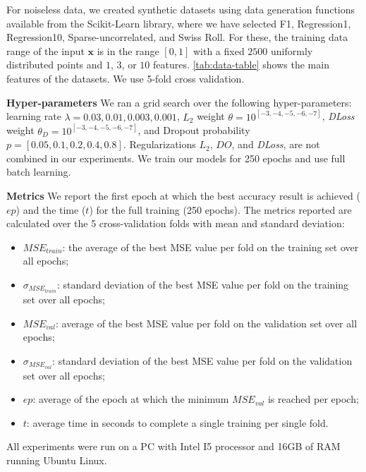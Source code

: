 \documentclass[conference]{IEEEtran}
\begin{document}
For noiseless data, we created synthetic datasets using data generation functions available from the Scikit-Learn library, where we have selected F1, Regression1, Regression10, Sparse-uncorrelated, and Swiss Roll. 
For these, the training data range of the input $\mathbf{x}$ is in the range $[0,1]$ with a fixed $2500$ uniformly distributed points and $1$, $3$, or $10$ features.
\autoref{tab:data-table} shows the main features of the datasets.
We use 5-fold cross validation. 




\textbf{Hyper-parameters}
We ran a grid search over the following hyper-parameters: learning rate $\lambda = 0.03,0.01,0.003,0.001$, $L_2$ weight $\theta = 10^{[-3,-4,-5,-6,-7]}$, \emph{DLoss} weight $\theta_{D} = 10^{[-3,-4,-5,-6,-7]}$, and Dropout probability $p = [0.05,0.1,0.2,0.4,0.8]$.
Regularizations $L_2$, $DO$, and \emph{DLoss}, are not combined in our experiments. 
We train our models for 250 epochs and use full batch learning. 

\textbf{Metrics} We report the first epoch at which the best accuracy result is achieved ($ep$) and the time ($t$) for the full training (250 epochs).
The metrics reported are calculated over the 5 cross-validation folds with mean and standard deviation: 
\begin{itemize}
 \item \textbf{$MSE_{train}$}: the average of the best MSE value per fold on the training set over all epochs;
 \item \textbf{$\sigma_{{MSE}_{train}}$}: standard deviation of the best MSE value per fold on the training set over all epochs;
 \item \textbf{$MSE_{val}$}: average of the best MSE value per fold on the validation set over all epochs;
 \item \textbf{$\sigma_{{MSE}_{val}}$}: standard deviation of the best MSE value per fold on the validation set over all epochs;
 \item \textbf{$ep$}: average of the epoch at which the minimum $MSE_{val}$ is reached per epoch;
 \item \textbf{$t$}: average time in seconds to complete a single training per single fold.
\end{itemize}
All experiments were run on a PC with Intel I5 processor and 16GB of RAM running Ubuntu Linux. 

\end{document}
